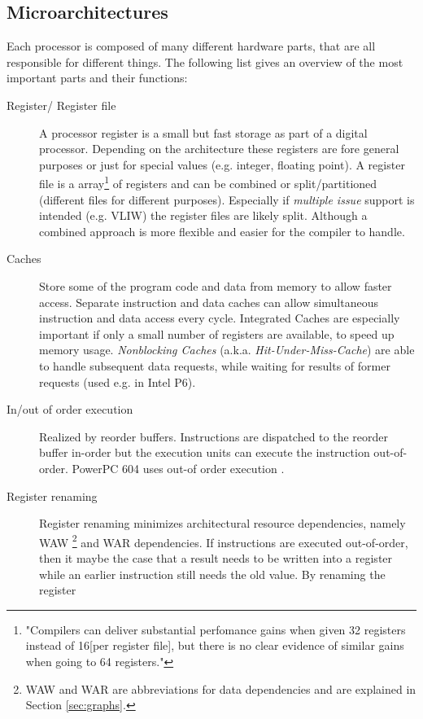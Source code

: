 \documentclass[a4paper,10pt]{article}
\begin{document}
\subsection{Microarchitectures}
Each processor is composed of many different hardware parts, that are all responsible for different things. The following list gives an
overview of the most important parts and their functions:
\begin{description}

 \item[Register/ Register file] A processor register is a small but fast storage as part of a digital processor. Depending on the architecture these registers are fore general purposes or just for special values (e.g. integer, floating point). A register file is a array\footnote{"Compilers can deliver substantial perfomance gains when given 32 registers instead of 16[per register file], but there is no clear evidence of similar gains when going to 64 registers."\cite{alpha}} of registers and can be combined or split/partitioned (different files for different purposes). Especially if \emph{multiple issue} support is intended (e.g. VLIW) the register files are likely split. Although a combined approach is more flexible and easier for the compiler to handle.
 \item[Caches] Store some of the program code and data from memory to allow faster access. Separate instruction and data caches
       can allow simultaneous instruction and data access every cycle. Integrated Caches are especially important if only a small number of registers are available, to speed up memory usage. \emph{Nonblocking Caches} (a.k.a. \emph{Hit-Under-Miss-Cache}) are able to handle subsequent data requests, while waiting for results of former requests (used e.g. in Intel P6).
 \item[In/out of order execution] Realized by reorder buffers. Instructions are dispatched to the reorder buffer in-order but
       the execution units can execute the instruction out-of-order. PowerPC 604 uses out-of order execution \cite{powerpc}.
 \item[Register renaming] Register renaming minimizes architectural resource dependencies, namely WAW
       \footnote{\label{footnote-waw}WAW and WAR are abbreviations for data dependencies and are explained in Section \ref{sec:graphs}.}
       and WAR dependencies. If instructions are executed out-of-order, then it maybe the case
       that a result needs to be written into a register while an earlier instruction still needs the old value. By renaming the register

\end{description}
\end{document}
